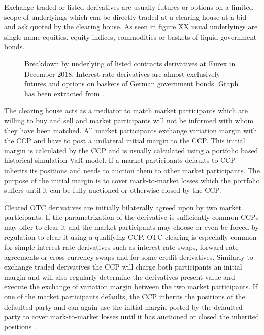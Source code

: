 \documentclass[../Thesis_AHoecherl.tex]{subfiles}
\begin{document}
    Exchange traded or listed derivatives are usually futures or options on a limited scope of underlyings which can be directly traded at a clearing house at a bid and ask quoted by the clearing house. As seen in figure XX usual underlyings are single name equities, equity indices, commodities or baskets of liquid government bonds. 
    \begin{figure}
        \centering
        \def\svgwidth{\columnwidth}
        
        \caption{Breakdown by underlying of listed contracts derivatives at Eurex in December 2018. Interest rate derivatives are almost exclusively futures and options on baskets of German government bonds. Graph has been extracted from \citep{EurexDec2018}.}
    \end{figure}
    The clearing house acts as a mediator to match market participants which are willing to buy and sell and market participants will not be informed with whom they have been matched. All market participants exchange variation margin with the CCP and have to post a unilateral initial margin to the CCP. This initial margin is calculated by the CCP and is usually calculated using a portfolio based historical simulation VaR model. If a market participants defaults to CCP inherits its positions and needs to auction them to other market participants. The purpose of the initial margin is to cover mark-to-market losses which the portfolio suffers until it can be fully auctioned or otherwise closed by the CCP.
    
    Cleared OTC derivatives are initially bilaterally agreed upon by two market participants. If the parametrization of the derivative is sufficiently common CCPs may offer to clear it and the market participants may choose or even be forced by regulation to clear it using a qualifying CCP. OTC clearing is especially common for simple interest rate derivatives such as interest rate swaps, forward rate agreements or cross currency swaps and for some credit derivatives. Similarly to exchange traded derivatives the CCP will charge both participants an initial margin and will also regularly determine the derivatives present value and execute the exchange of variation margin between the two market participants. If one of the market participants defaults, the CCP inherits the positions of the defaulted party and can again use the initial margin posted by the defaulted party to cover mark-to-market losses until it has auctioned or closed the inherited positions \citep{EurexDMP}.
    
\end{document}
